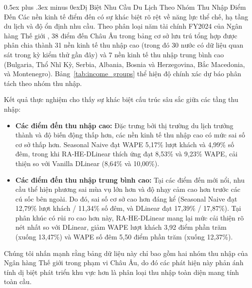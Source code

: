 \documentclass[10pt,journal,compsoc]{IEEEtran}
\makeatletter
\def\subsection{\@startsection{subsection}{2}{\z@}{-1.8ex plus -0.6ex minus -0.3ex}%
{0.5ex plus .3ex minus 0ex}{\normalfont\normalsize\rmfamily\bfseries}}
\makeatother
\begin{document}
\subsection{Dị Biệt Nhu Cầu Du Lịch Theo Nhóm Thu Nhập Điểm Đến}
\label{sec:income_heterogeneity}
Các nền kinh tế điểm đến có sự khác biệt rõ rệt về năng lực thể chế, hạ tầng du lịch và độ ổn định nhu cầu. Theo phân loại năm tài chính FY2024 của Ngân hàng Thế giới \cite{worldbank_income_fy24,income_fy24_table}, 38 điểm đến Châu Âu trong bảng cơ sở lưu trú tổng hợp được phân chia thành 31 nền kinh tế thu nhập cao (trong đó 30 nước có dữ liệu quan sát trong kỳ kiểm thử gần đây) và 7 nền kinh tế thu nhập trung bình cao (Bulgaria, Thổ Nhĩ Kỳ, Serbia, Albania, Bosnia và Herzegovina, Bắc Macedonia, và Montenegro). Bảng~\ref{tab:income_groups} thể hiện độ chính xác dự báo phân tách theo nhóm thu nhập.



Kết quả thực nghiệm cho thấy sự khác biệt cấu trúc sâu sắc giữa các tầng thu nhập:
\begin{itemize}
    \item \textbf{Các điểm đến thu nhập cao:} Đặc trưng bởi thị trường du lịch trưởng thành và độ biến động thấp hơn, các nền kinh tế thu nhập cao có mức sai số cơ sở thấp hơn. Seasonal Naive đạt WAPE 5,17\% lượt khách và 4,99\% số đêm, trong khi RA-HE-DLinear thích ứng đạt 8,53\% và 9,23\% WAPE, cải thiện so với Vanilla DLinear (8,64\% và 10,00\%).
    \item \textbf{Các điểm đến thu nhập trung bình cao:} Tại các điểm đến mới nổi, nhu cầu thể hiện phương sai mùa vụ lớn hơn và độ nhạy cảm cao hơn trước các cú sốc bên ngoài. Do đó, sai số cơ sở cao hơn đáng kể (Seasonal Naive đạt 12,79\% lượt khách / 11,34\% số đêm, và DLinear đạt 17,39\% / 17,87\%). Tại phân khúc có rủi ro cao hơn này, RA-HE-DLinear mang lại mức cải thiện rõ nét nhất so với DLinear, giảm WAPE lượt khách 3,92 điểm phần trăm (xuống 13,47\%) và WAPE số đêm 5,50 điểm phần trăm (xuống 12,37\%).
\end{itemize}
Chúng tôi nhấn mạnh rằng bảng dữ liệu này chỉ bao gồm hai nhóm thu nhập của Ngân hàng Thế giới trong phạm vi Châu Âu, do đó các phát hiện này phản ánh tính dị biệt phát triển khu vực hơn là phân loại thu nhập toàn diện mang tính toàn cầu.


\end{document}
